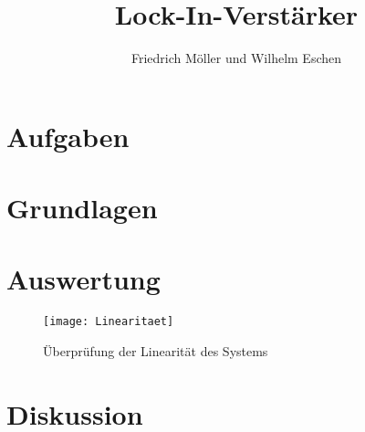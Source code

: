 \documentclass{article}						%
\title{Lock-In-Verstärker}
\author{Friedrich Möller und Wilhelm Eschen}
\begin{document}
	\maketitle
	\tableofcontents
	\clearpage
			

\section{Aufgaben}

	
\clearpage

\section{Grundlagen}
		
		
	\clearpage
				 
\section{Auswertung}		
		
		\begin{figure}[h!]
			\centering
			\texttt{[image: Linearitaet]}
			\caption{Überprüfung der Linearität des Systems}
		\end{figure}
	\newline
		
	\clearpage

\section{Diskussion}
				
\end{document}
